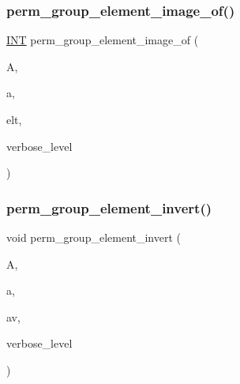 \mbox{\label{interface__perm__group_8_c_a92c32b2728749c0abc53100001ee01b3}} 
\subsubsection{\texorpdfstring{perm\+\_\+group\+\_\+element\+\_\+image\+\_\+of()}{perm\_group\_element\_image\_of()}}
{\footnotesize\ttfamily \mbox{\hyperlink{galois_8h_a09fddde158a3a20bd2dcadb609de11dc}{I\+NT}} perm\+\_\+group\+\_\+element\+\_\+image\+\_\+of (\begin{DoxyParamCaption}\item[{\mbox{\hyperlink{classaction}{action}} \&}]{A,  }\item[{\mbox{\hyperlink{galois_8h_a09fddde158a3a20bd2dcadb609de11dc}{I\+NT}}}]{a,  }\item[{void $\ast$}]{elt,  }\item[{\mbox{\hyperlink{galois_8h_a09fddde158a3a20bd2dcadb609de11dc}{I\+NT}}}]{verbose\+\_\+level }\end{DoxyParamCaption})}

\mbox{\label{interface__perm__group_8_c_a96f61c7fbc6a187176ee94d71af31a6a}} 
\subsubsection{\texorpdfstring{perm\+\_\+group\+\_\+element\+\_\+invert()}{perm\_group\_element\_invert()}}
{\footnotesize\ttfamily void perm\+\_\+group\+\_\+element\+\_\+invert (\begin{DoxyParamCaption}\item[{\mbox{\hyperlink{classaction}{action}} \&}]{A,  }\item[{void $\ast$}]{a,  }\item[{void $\ast$}]{av,  }\item[{\mbox{\hyperlink{galois_8h_a09fddde158a3a20bd2dcadb609de11dc}{I\+NT}}}]{verbose\+\_\+level }\end{DoxyParamCaption})}

